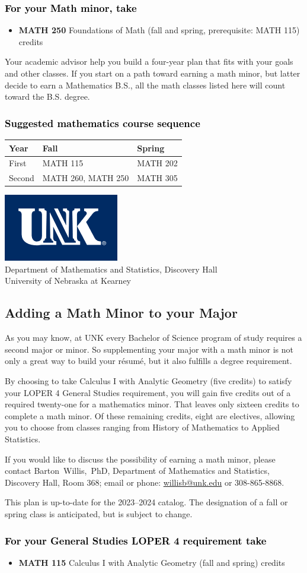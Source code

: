 \documentclass[11pt]{article}
\makeatletter
\newcommand{\calcone}{\textbf{MATH 115} Calculus I with Analytic Geometry (fall and spring) \dotfill 5 credits}
\newcommand{\calconeshort}{MATH 115}
\newcommand{\calctwoshort}{MATH 202}
\newcommand{\foundations}{\textbf{MATH 250} Foundations of Math (fall and spring, prerequisite: MATH 115)  \dotfill 3 credits}
\newcommand{\foundationsshort}{MATH 250}
\newcommand{\calcthreeshort}{MATH 260}
\newcommand{\diffeqshort}{MATH 305}
\newcommand{\contactbw}{\mbox{Barton Willis, PhD}, Department of Mathematics and Statistics,  Discovery Hall, Room 368;
email or phone: \href{mailto:willisb@unk.edu}{willisb@unk.edu} or 308-865-8868.}
\newcommand{\forinfo}[2]{If you would like to discuss the possibility of earning a math {#1}, please contact \contactbw}
\newcommand{\catalog}{2023--2024 }
\newcommand{\LOPER}{LOPER\xspace}
\newcommand{\uptodate}{This plan is up-to-date for  the \catalog catalog. The designation of a fall or spring class is 
anticipated, but  is subject to change.}
\newcommand{\myheading}{
\begin{flushleft}
\includegraphics[scale=0.35]{unk-logo}\\
\setcounter{footnote}{0}
\vspace{0.25in}
 \textcolor{unkblue}{Department of Mathematics and Statistics, Discovery Hall} \\
  \textcolor{unkblue}{University of Nebraska at Kearney}
\end{flushleft}}
\newcommand{\mathminorALT}{
\begin{center}
   \begin{tabular}[h]{| l | l | l|} 
      \hline
       \textbf{Year}          & \textbf{Fall}         &  \textbf{Spring}  \\ \hline 
      First & \calconeshort & \calctwoshort{}  \\  \hline
      Second &  \calcthreeshort{},  \foundationsshort{}  & \diffeqshort \\ \hline
         \end{tabular}
      \end{center}}
\makeatother
\begin{document}
\subsubsection*{\textcolor{black}{For your Math minor, take}}
\begin{itemize}
\item \foundations
\end{itemize}
\vspace{0.1in}
\noindent Your academic advisor help you build a four-year plan that
fits with your goals and other classes. If you start on a path 
toward earning  a math minor, but latter decide to earn a 
Mathematics B.S., all the math classes listed here will count 
toward the B.S. degree.


\subsubsection*{\textcolor{black}{Suggested mathematics course sequence}}

\mathminorALT




\newpage

\myheading

\subsection*{\textbf{\textcolor{unkblue}{Adding a Math Minor to your Major}}}

As you may know, at UNK every Bachelor of Science program of study requires a second
major or minor. So supplementing your major with a math minor is not only a great
way to build your r\'esum\'e, but it also fulfills a degree requirement.

By choosing to take Calculus I with Analytic Geometry (five credits) to satisfy
your \LOPER 4 General Studies requirement, you will gain five credits out of a
required twenty-one for a mathematics minor. That leaves only sixteen credits
to complete a math minor.  Of these remaining credits, eight are electives, allowing
you to choose from classes ranging from History of Mathematics to Applied Statistics.


\forinfo{minor}{program of study}

\uptodate

\subsubsection*{\textcolor{black}{For your General Studies \LOPER 4 requirement take}}
\begin{itemize}
\item \calcone
\end{itemize}
\end{document}
